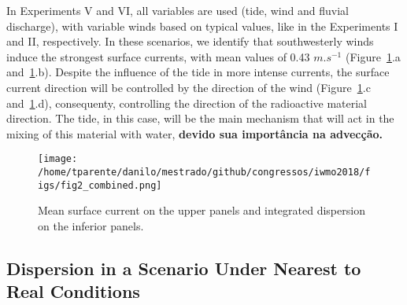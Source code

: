 \documentclass[final]{beamer}
\begin{document}
\begin{frame}
\begin{multicols}{2}
In Experiments V and VI, all variables are used (tide, wind and fluvial discharge), with
variable winds based on typical values, like in the Experiments I and II, respectively. 
In these scenarios, we identify that southwesterly winds induce the strongest surface
currents, with mean values of 0.43 $m.s^{-1}$ (Figure~\ref{fig:cenariosDispersao}.a 
and~\ref{fig:cenariosDispersao}.b). Despite the influence of the tide in more intense currents, 
the surface current direction will be controlled by the direction of the wind 
(Figure~\ref{fig:cenariosDispersao}.c and~\ref{fig:cenariosDispersao}.d), 
consequenty, controlling the direction of the radioactive material direction.
The tide, in this case, will be the main mechanism that will act in the mixing of
this material with water, \textbf{devido sua importância na advecção.}


\begin{figure}
\centering
\texttt{[image: /home/tparente/danilo/mestrado/github/congressos/iwmo2018/figs/fig2\_combined.png]}
\caption{Mean surface current on the upper panels and integrated dispersion on the inferior panels.}
\label{fig:cenariosDispersao}
\end{figure}

\subsection{Dispersion in a Scenario Under Nearest to Real Conditions}





\end{multicols}
\end{frame}
\end{document}
